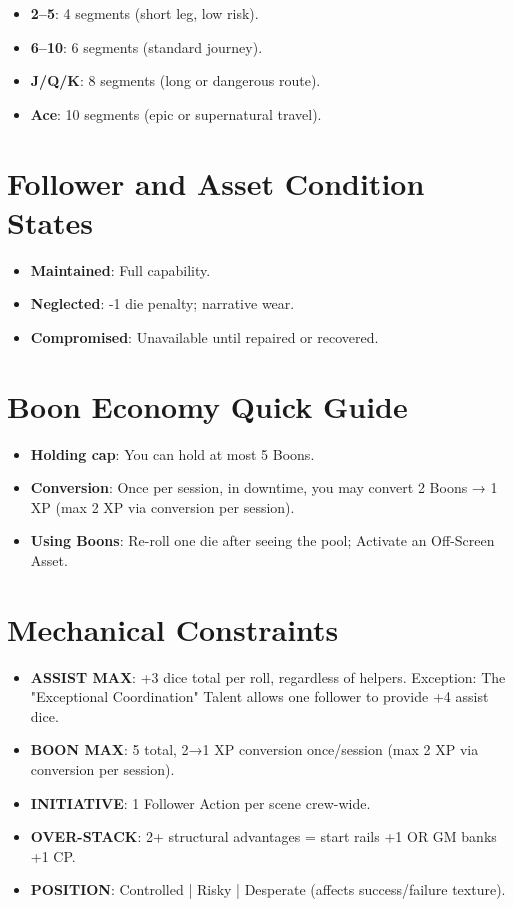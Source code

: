 \begin{itemize}
    \item \textbf{2--5}: 4 segments (short leg, low risk).
    \item \textbf{6--10}: 6 segments (standard journey).
    \item \textbf{J/Q/K}: 8 segments (long or dangerous route).
    \item \textbf{Ace}: 10 segments (epic or supernatural travel).
\end{itemize}

\section*{Follower and Asset Condition States}

\begin{itemize}
    \item \textbf{Maintained}: Full capability.
    \item \textbf{Neglected}: -1 die penalty; narrative wear.
    \item \textbf{Compromised}: Unavailable until repaired or recovered.
\end{itemize}

\section*{Boon Economy Quick Guide}

\begin{itemize}
    \item \textbf{Holding cap}: You can hold at most 5 Boons.
    \item \textbf{Conversion}: Once per session, in downtime, you may convert 2 Boons → 1 XP (max 2 XP via conversion per session).
    \item \textbf{Using Boons}: Re-roll one die after seeing the pool; Activate an Off-Screen Asset.
\end{itemize}

\section*{Mechanical Constraints}

\begin{itemize}
    \item \textbf{ASSIST MAX}: +3 dice total per roll, regardless of helpers. Exception: The "Exceptional Coordination" Talent allows one follower to provide +4 assist dice.
    \item \textbf{BOON MAX}: 5 total, 2→1 XP conversion once/session (max 2 XP via conversion per session).
    \item \textbf{INITIATIVE}: 1 Follower Action per scene crew-wide.
    \item \textbf{OVER-STACK}: 2+ structural advantages = start rails +1 OR GM banks +1 CP.
    \item \textbf{POSITION}: Controlled | Risky | Desperate (affects success/failure texture).
\end{itemize}

